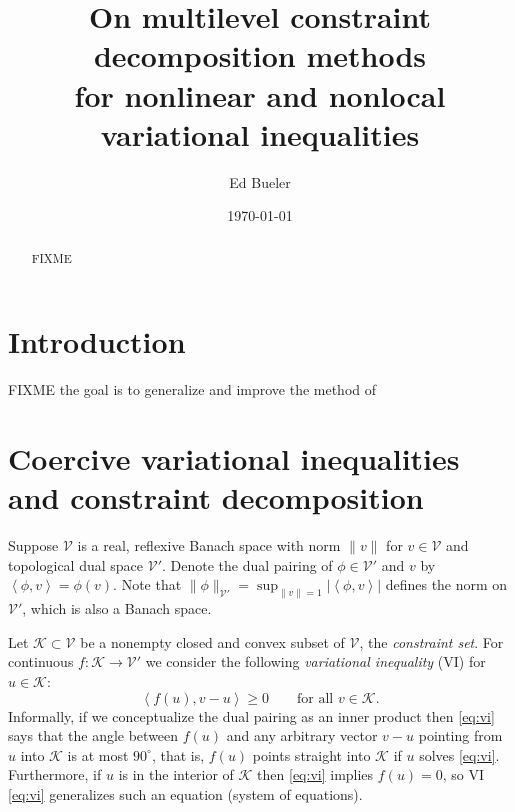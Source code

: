 \documentclass[letterpaper,final,12pt,reqno]{amsart}
\theoremstyle{cstyle}
\theoremstyle{dstyle}
\numberwithin{equation}{section}
\numberwithin{figure}{section}
\numberwithin{table}{section}
\numberwithin{theorem}{section}
\newcommand{\cK}{\mathcal{K}}
\newcommand{\cV}{\mathcal{V}}
\newcommand{\ip}[2]{\left<#1,#2\right>}
\begin{document}
\title[On MCD methods for nonlinear and nonlocal VIs]{On multilevel constraint decomposition methods \\ for nonlinear and nonlocal variational inequalities}

\author{Ed Bueler}

\date{\today}

\begin{abstract} FIXME
\end{abstract}

\maketitle


\thispagestyle{empty}

\section{Introduction} \label{sec:intro}

FIXME the goal is to generalize and improve the method of \cite{Tai2003}


\section{Coercive variational inequalities and constraint decomposition} \label{sec:vi}

Suppose $\cV$ is a real, reflexive Banach space with norm $\|v\|$ for $v\in\cV$ and topological dual space $\cV'$.  Denote the dual pairing of $\phi \in \cV'$ and $v$ by $\ip{\phi}{v} = \phi(v)$.  Note that $\|\phi\|_{\cV'} = \sup_{\|v\|=1} |\ip{\phi}{v}|$ defines the norm on $\cV'$, which is also a Banach space.

Let $\cK \subset \cV$ be a nonempty closed and convex subset of $\cV$, the \emph{constraint set}.  For continuous $f:\cK \to \cV'$ we consider the following \emph{variational inequality} (VI) for $u\in \cK$:
\begin{equation}
\ip{f(u)}{v-u} \ge 0 \qquad \text{for all } v\in \cK. \label{eq:vi}
\end{equation}
Informally, if we conceptualize the dual pairing as an inner product then \eqref{eq:vi} says that the angle between $f(u)$ and any arbitrary vector $v-u$ pointing from $u$ into $\cK$ is at most $90^\circ$, that is, $f(u)$ points straight into $\cK$ if $u$ solves \eqref{eq:vi}.  Furthermore, if $u$ is in the interior of $\cK$ then \eqref{eq:vi} implies $f(u)=0$, so VI \eqref{eq:vi} generalizes such an equation (system of equations).
\end{document}
